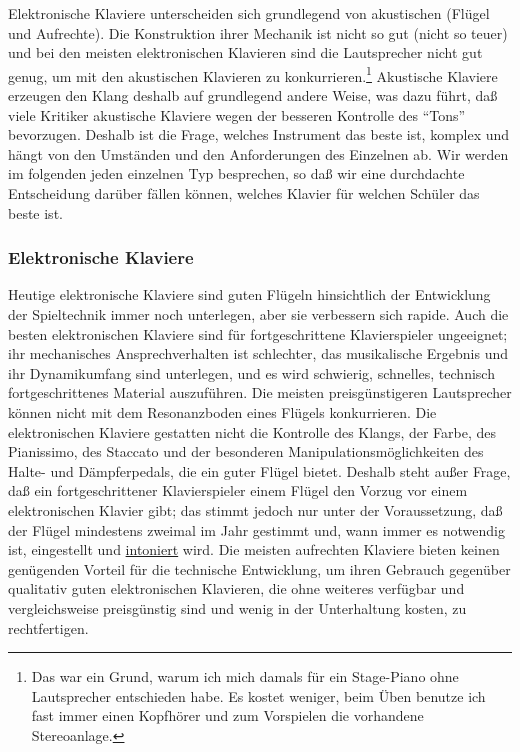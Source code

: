 Elektronische Klaviere unterscheiden sich grundlegend von akustischen (Flügel und Aufrechte).
Die Konstruktion ihrer Mechanik ist nicht so gut (nicht so teuer) und bei den meisten elektronischen Klavieren sind die Lautsprecher nicht gut genug, um mit den akustischen Klavieren zu konkurrieren.\footnote{Das war ein Grund, warum ich mich damals für ein Stage-Piano ohne Lautsprecher entschieden habe.
Es kostet weniger, beim Üben benutze ich fast immer einen Kopfhörer und zum Vorspielen die vorhandene Stereoanlage.}
Akustische Klaviere erzeugen den Klang deshalb auf grundlegend andere Weise, was dazu führt, daß viele Kritiker akustische Klaviere wegen der besseren Kontrolle des \enquote{Tons} bevorzugen.
Deshalb ist die Frage, welches Instrument das beste ist, komplex und hängt von den Umständen und den Anforderungen des Einzelnen ab.
Wir werden im folgenden jeden einzelnen Typ besprechen, so daß wir eine durchdachte Entscheidung darüber fällen können, welches Klavier für welchen Schüler das beste ist.

 
\subsubsection{Elektronische Klaviere}
\label{c1iii17b}

Heutige elektronische Klaviere sind guten Flügeln hinsichtlich der Entwicklung der Spieltechnik immer noch 
unterlegen, aber sie verbessern sich rapide.
Auch die besten elektronischen Klaviere sind für fortgeschrittene Klavierspieler ungeeignet; ihr mechanisches Ansprechverhalten ist schlechter, das musikalische Ergebnis und ihr Dynamikumfang sind unterlegen, und es wird schwierig, schnelles, technisch fortgeschrittenes Material auszuführen.
Die meisten preisgünstigeren Lautsprecher können nicht mit dem Resonanzboden eines Flügels konkurrieren.
Die elektronischen Klaviere gestatten nicht die Kontrolle des Klangs, der Farbe, des Pianissimo, des Staccato und der besonderen Manipulationsmöglichkeiten des Halte- und Dämpferpedals, die ein guter Flügel bietet.
Deshalb steht außer Frage, daß ein fortgeschrittener Klavierspieler einem Flügel den Vorzug vor einem elektronischen Klavier gibt; das stimmt jedoch nur unter der Voraussetzung, daß der Flügel mindestens zweimal im Jahr gestimmt und, wann immer es notwendig ist, eingestellt und \hyperref[c2_7_hamm]{intoniert} wird.
Die meisten aufrechten Klaviere bieten keinen genügenden Vorteil für die technische Entwicklung, um ihren Gebrauch gegenüber qualitativ guten elektronischen Klavieren, die ohne weiteres verfügbar und vergleichsweise preisgünstig sind und wenig in der Unterhaltung kosten, zu rechtfertigen.

